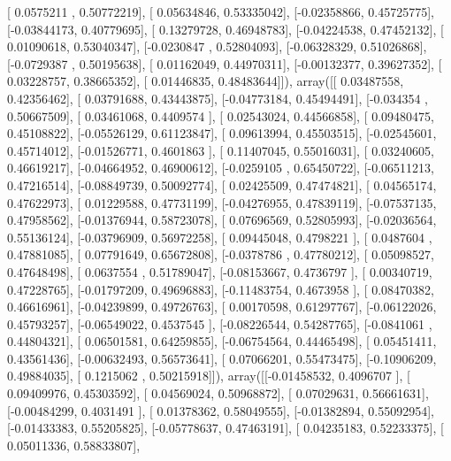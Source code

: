 \documentclass{article}
\begin{document}
       [ 0.0575211 ,  0.50772219],
       [ 0.05634846,  0.53335042],
       [-0.02358866,  0.45725775],
       [-0.03844173,  0.40779695],
       [ 0.13279728,  0.46948783],
       [-0.04224538,  0.47452132],
       [ 0.01090618,  0.53040347],
       [-0.0230847 ,  0.52804093],
       [-0.06328329,  0.51026868],
       [-0.0729387 ,  0.50195638],
       [ 0.01162049,  0.44970311],
       [-0.00132377,  0.39627352],
       [ 0.03228757,  0.38665352],
       [ 0.01446835,  0.48483644]]), array([[ 0.03487558,  0.42356462],
       [ 0.03791688,  0.43443875],
       [-0.04773184,  0.45494491],
       [-0.034354  ,  0.50667509],
       [ 0.03461068,  0.4409574 ],
       [ 0.02543024,  0.44566858],
       [ 0.09480475,  0.45108822],
       [-0.05526129,  0.61123847],
       [ 0.09613994,  0.45503515],
       [-0.02545601,  0.45714012],
       [-0.01526771,  0.4601863 ],
       [ 0.11407045,  0.55016031],
       [ 0.03240605,  0.46619217],
       [-0.04664952,  0.46900612],
       [-0.0259105 ,  0.65450722],
       [-0.06511213,  0.47216514],
       [-0.08849739,  0.50092774],
       [ 0.02425509,  0.47474821],
       [ 0.04565174,  0.47622973],
       [ 0.01229588,  0.47731199],
       [-0.04276955,  0.47839119],
       [-0.07537135,  0.47958562],
       [-0.01376944,  0.58723078],
       [ 0.07696569,  0.52805993],
       [-0.02036564,  0.55136124],
       [-0.03796909,  0.56972258],
       [ 0.09445048,  0.4798221 ],
       [ 0.0487604 ,  0.47881085],
       [ 0.07791649,  0.65672808],
       [-0.0378786 ,  0.47780212],
       [ 0.05098527,  0.47648498],
       [ 0.0637554 ,  0.51789047],
       [-0.08153667,  0.4736797 ],
       [ 0.00340719,  0.47228765],
       [-0.01797209,  0.49696883],
       [-0.11483754,  0.4673958 ],
       [ 0.08470382,  0.46616961],
       [-0.04239899,  0.49726763],
       [ 0.00170598,  0.61297767],
       [-0.06122026,  0.45793257],
       [-0.06549022,  0.4537545 ],
       [-0.08226544,  0.54287765],
       [-0.0841061 ,  0.44804321],
       [ 0.06501581,  0.64259855],
       [-0.06754564,  0.44465498],
       [ 0.05451411,  0.43561436],
       [-0.00632493,  0.56573641],
       [ 0.07066201,  0.55473475],
       [-0.10906209,  0.49884035],
       [ 0.1215062 ,  0.50215918]]), array([[-0.01458532,  0.4096707 ],
       [ 0.09409976,  0.45303592],
       [ 0.04569024,  0.50968872],
       [ 0.07029631,  0.56661631],
       [-0.00484299,  0.4031491 ],
       [ 0.01378362,  0.58049555],
       [-0.01382894,  0.55092954],
       [-0.01433383,  0.55205825],
       [-0.05778637,  0.47463191],
       [ 0.04235183,  0.52233375],
       [ 0.05011336,  0.58833807],
\end{document}

